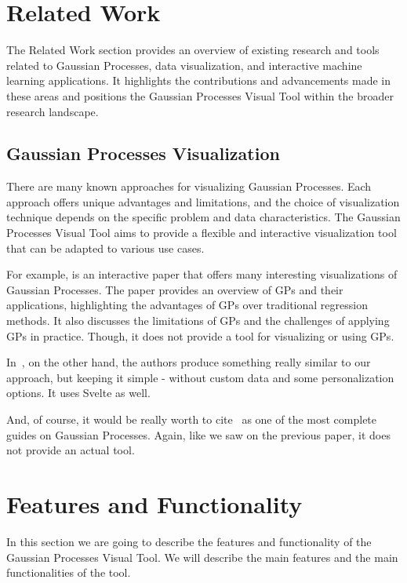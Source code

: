 \documentclass[preprint,journal]{vgtc}       %
\begin{document}
\section{Related Work}

The Related Work section provides an overview of existing research and tools related to Gaussian Processes, data visualization, and interactive machine learning applications. It highlights the contributions and advancements made in these areas and positions the Gaussian Processes Visual Tool within the broader research landscape.

\subsection{Gaussian Processes Visualization}

There are many known approaches for visualizing Gaussian Processes. Each approach offers unique advantages and limitations, and the choice of visualization technique depends on the specific problem and data characteristics. The Gaussian Processes Visual Tool aims to provide a flexible and interactive visualization tool that can be adapted to various use cases.

For example, \cite{gortler2019a} is an interactive paper that offers many interesting visualizations of Gaussian Processes. The paper provides an overview of GPs and their applications, highlighting the advantages of GPs over traditional regression methods. It also discusses the limitations of GPs and the challenges of applying GPs in practice. Though, it does not provide a tool for visualizing or using GPs.

In~\cite{smlbook}, on the other hand, the authors produce something really similar to our approach, but keeping it simple - without custom data and some personalization options. It uses Svelte as well.

And, of course, it would be really worth to cite~\cite{gpguide} as one of the most complete guides on Gaussian Processes. Again, like we saw on the previous paper, it does not provide an actual tool.

\section{Features and Functionality}
 
In this section we are going to describe the features and functionality of the Gaussian Processes Visual Tool. We will describe the main features and the main functionalities of the tool.
\end{document}
